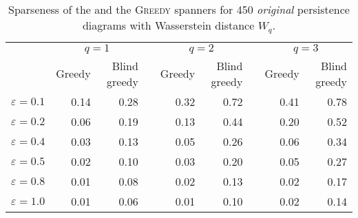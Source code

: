 \documentclass[]{ws-ijcga}
\newcommand{\eps}{\varepsilon}
\newcommand{\dtype}[1]{{\textit{\small #1}}}
\begin{document}
\begin{table}\centering
\begin{tabular}{@{}rrrcrrcrr@{}}\toprule
                          & \multicolumn{2}{c}{$q=1$} & \phantom{a} & \multicolumn{2}{c}{$q=2$} & \phantom{a} & \multicolumn{2}{c}{$q=3$}\\
                          \cmidrule{2-3} \cmidrule{5-6} \cmidrule{8-9}
                          & Greedy & Blind greedy && Greedy & Blind greedy && Greedy & Blind greedy \\ \midrule
$\eps = 0.1$                & 0.14  & 0.28         && 0.32  & 0.72      &&   0.41  & 0.78 \\
$\eps = 0.2$                & 0.06 & 0.19          && 0.13 & 0.44       &&   0.20  & 0.52 \\
$\eps = 0.4$               & 0.03 &  0.13          && 0.05 & 0.26        &&   0.06  & 0.34 \\
$\eps = 0.5$               & 0.02 &  0.10          && 0.03 & 0.20        &&   0.05  & 0.27 \\
$\eps = 0.8$               & 0.01 & 0.08           && 0.02  & 0.13        &&   0.02  & 0.17 \\
$\eps = 1.0$               & 0.01 &  0.06  && 0.01 & 0.10        &&   0.02  & 0.14 \\
\bottomrule
\end{tabular}
    \caption{Sparseness of the \bgrdy and the \textsc{Greedy} spanners for 450 \dtype{original} persistence diagrams
 with Wasserstein distance $W_q$.}
\label{tbl:mcgill_original_blind_greedy_spanner_sparseness}
\end{table}
\end{document}
